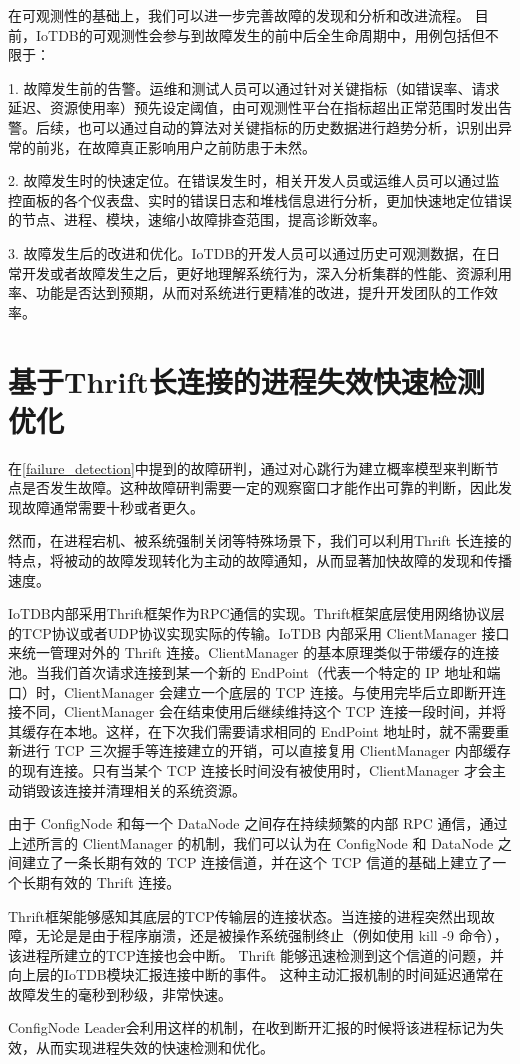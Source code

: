 在可观测性的基础上，我们可以进一步完善故障的发现和分析和改进流程。
目前，IoTDB的可观测性会参与到故障发生的前中后全生命周期中，用例包括但不限于：

1. 故障发生前的告警。运维和测试人员可以通过针对关键指标（如错误率、请求延迟、资源使用率）预先设定阈值，由可观测性平台在指标超出正常范围时发出告警。后续，也可以通过自动的算法对关键指标的历史数据进行趋势分析，识别出异常的前兆，在故障真正影响用户之前防患于未然。

2. 故障发生时的快速定位。在错误发生时，相关开发人员或运维人员可以通过监控面板的各个仪表盘、实时的错误日志和堆栈信息进行分析，更加快速地定位错误的节点、进程、模块，速缩小故障排查范围，提高诊断效率。

3. 故障发生后的改进和优化。IoTDB的开发人员可以通过历史可观测数据，在日常开发或者故障发生之后，更好地理解系统行为，深入分析集群的性能、资源利用率、功能是否达到预期，从而对系统进行更精准的改进，提升开发团队的工作效率。


\section{基于Thrift长连接的进程失效快速检测优化}\label{sec:detection-thrift}

在\ref{failure_detection}中提到的故障研判，通过对心跳行为建立概率模型来判断节点是否发生故障。这种故障研判需要一定的观察窗口才能作出可靠的判断，因此发现故障通常需要十秒或者更久。

然而，在进程宕机、被系统强制关闭等特殊场景下，我们可以利用Thrift 长连接的特点，将被动的故障发现转化为主动的故障通知，从而显著加快故障的发现和传播速度。

IoTDB内部采用Thrift\cite{slee2007thrift}框架作为RPC通信的实现。Thrift框架底层使用网络协议层的TCP协议或者UDP协议实现实际的传输。IoTDB 内部采用 ClientManager 接口来统一管理对外的 Thrift 连接。ClientManager 的基本原理类似于带缓存的连接池。当我们首次请求连接到某一个新的 EndPoint（代表一个特定的 IP 地址和端口）时，ClientManager 会建立一个底层的 TCP 连接。与使用完毕后立即断开连接不同，ClientManager 会在结束使用后继续维持这个 TCP 连接一段时间，并将其缓存在本地。这样，在下次我们需要请求相同的 EndPoint 地址时，就不需要重新进行 TCP 三次握手等连接建立的开销，可以直接复用 ClientManager 内部缓存的现有连接。只有当某个 TCP 连接长时间没有被使用时，ClientManager 才会主动销毁该连接并清理相关的系统资源。

由于 ConfigNode 和每一个 DataNode 之间存在持续频繁的内部 RPC 通信，通过上述所言的 ClientManager 的机制，我们可以认为在 ConfigNode 和 DataNode 之间建立了一条长期有效的 TCP 连接信道，并在这个 TCP 信道的基础上建立了一个长期有效的 Thrift 连接。

Thrift框架能够感知其底层的TCP传输层的连接状态。当连接的进程突然出现故障，无论是是由于程序崩溃，还是被操作系统强制终止（例如使用 kill -9 命令），该进程所建立的TCP连接也会中断。
Thrift 能够迅速检测到这个信道的问题，并向上层的IoTDB模块汇报连接中断的事件。
这种主动汇报机制的时间延迟通常在故障发生的毫秒到秒级，非常快速。

ConfigNode Leader会利用这样的机制，在收到断开汇报的时候将该进程标记为失效，从而实现进程失效的快速检测和优化。